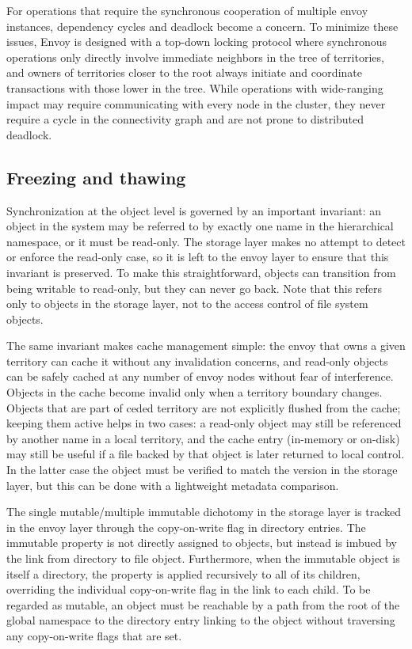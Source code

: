 For operations that require the synchronous cooperation of multiple envoy instances, dependency cycles and deadlock become a concern. To minimize these issues, Envoy is designed with a top-down locking protocol where synchronous operations only directly involve immediate neighbors in the tree of territories, and owners of territories closer to the root always initiate and coordinate transactions with those lower in the tree. While operations with wide-ranging impact may require communicating with every node in the cluster, they never require a cycle in the connectivity graph and are not prone to distributed deadlock.

\subsection{Freezing and thawing}

Synchronization at the object level is governed by an important invariant: an object in the system may be referred to by exactly one name in the hierarchical namespace, or it must be read-only. The storage layer makes no attempt to detect or enforce the read-only case, so it is left to the envoy layer to ensure that this invariant is preserved. To make this straightforward, objects can transition from being writable to read-only, but they can never go back. Note that this refers only to objects in the storage layer, not to the access control of file system objects.

The same invariant makes cache management simple: the envoy that owns a given territory can cache it without any invalidation concerns, and read-only objects can be safely cached at any number of envoy nodes without fear of interference. Objects in the cache become invalid only when a territory boundary changes. Objects that are part of ceded territory are not explicitly flushed from the cache; keeping them active helps in two cases: a read-only object may still be referenced by another name in a local territory, and the cache entry (in-memory or on-disk) may still be useful if a file backed by that object is later returned to local control. In the latter case the object must be verified to match the version in the storage layer, but this can be done with a lightweight metadata comparison.

The single mutable/multiple immutable dichotomy in the storage layer is tracked in the envoy layer through the copy-on-write flag in directory entries. The immutable property is not directly assigned to objects, but instead is imbued by the link from directory to file object. Furthermore, when the immutable object is itself a directory, the property is applied recursively to all of its children, overriding the individual copy-on-write flag in the link to each child. To be regarded as mutable, an object must be reachable by a path from the root of the global namespace to the directory entry linking to the object without traversing any copy-on-write flags that are set.

